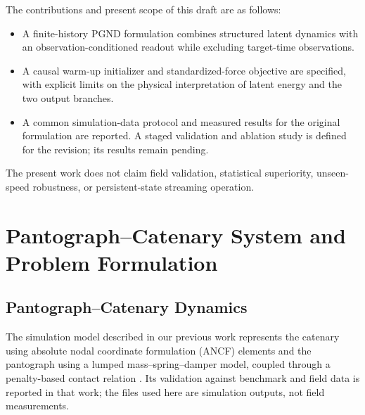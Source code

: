 \documentclass[journal,twoside]{IEEEtran}
\begin{document}
The contributions and present scope of this draft are as follows:
\begin{itemize}
    \item A finite-history PGND formulation combines structured latent
    dynamics with an observation-conditioned readout while excluding
    target-time observations.
    \item A causal warm-up initializer and standardized-force objective
    are specified, with explicit limits on the physical interpretation of
    latent energy and the two output branches.
    \item A common simulation-data protocol and measured results for the
    original formulation are reported. A staged validation and ablation
    study is defined for the revision; its results remain pending.
\end{itemize}
The present work does not claim field validation, statistical superiority,
unseen-speed robustness, or persistent-state streaming operation.

\section{Pantograph--Catenary System and Problem Formulation}
\label{sec:system}

\subsection{Pantograph--Catenary Dynamics}
The simulation model described in our previous work represents the catenary
using absolute nodal coordinate formulation (ANCF) elements and the
pantograph using a lumped mass--spring--damper model, coupled through a
penalty-based contact relation \cite{ale2026realtime}. Its validation against
benchmark and field data is reported in that work; the files used here are
simulation outputs, not field measurements.
\end{document}
